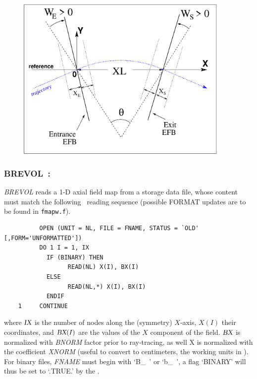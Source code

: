 \vfill
\begin{figure}[H]
  \centerline{\includegraphics[height=8cm]{Fig14.eps}}
  {\setlength{\captionwidth}{12cm}
	\hangcaption[Fig14]{\label{fig14}
               \CapBEND
    } }
\end{figure}

\vfill
\newpage


\subsubsection*{BREVOL~: \BREVOLTitl} \label{BREVOL}
\medskip

\textsl{BREVOL}  reads a 1-D axial field map from a storage data file,
whose content must match the following \FORTRAN\ reading sequence (possible FORMAT updates are to be found in \texttt{fmapw.f}).   

\bigskip


{\footnotesize
\begin{verbatim}
	      OPEN (UNIT = NL, FILE = FNAME, STATUS = `OLD' [,FORM='UNFORMATTED'])
	      DO 1 I = 1, IX
	        IF (BINARY) THEN 
	              READ(NL) X(I), BX(I)
	        ELSE
	              READ(NL,*) X(I), BX(I)
	        ENDIF
	1     CONTINUE
\end{verbatim}}
\medskip

\noindent where $\textsl{IX}$ is the number of nodes along the (symmetry) $X$-axis, $X(I)$
their coordinates, and $\textsl{BX}(I)$ are the values of the $X$ component of the field. $\textsl{BX}$ is 
normalized with \textsl{BNORM} factor prior to ray-tracing, as well  X is normalized with 
 the coefficient  \textsl{XNORM}  (useful to convert to centimeters, the working units in  \zgoubi). 
For binary files, \textsl{FNAME} must begin with \mbox{`B\_ '} or  \mbox{`b\_ '}, 
a flag `BINARY' will thus be set to `.TRUE.' by the \FORTRAN.  


